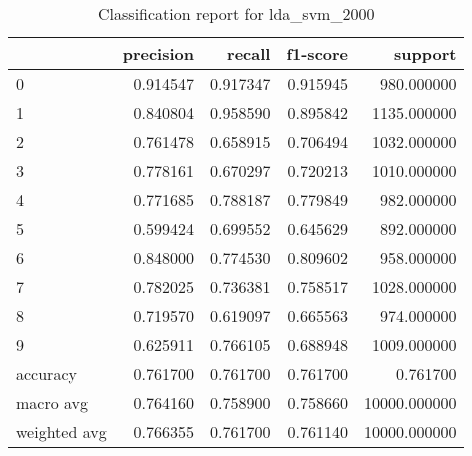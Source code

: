 \begin{table}[htb!]
\centering
\caption{Classification report for lda_svm_2000}
\label{tab:classification-report-lda_svm_2000}
\begin{tabular}{lrrrr}
\toprule
 & precision & recall & f1-score & support \\
\midrule
0 & 0.914547 & 0.917347 & 0.915945 & 980.000000 \\
1 & 0.840804 & 0.958590 & 0.895842 & 1135.000000 \\
2 & 0.761478 & 0.658915 & 0.706494 & 1032.000000 \\
3 & 0.778161 & 0.670297 & 0.720213 & 1010.000000 \\
4 & 0.771685 & 0.788187 & 0.779849 & 982.000000 \\
5 & 0.599424 & 0.699552 & 0.645629 & 892.000000 \\
6 & 0.848000 & 0.774530 & 0.809602 & 958.000000 \\
7 & 0.782025 & 0.736381 & 0.758517 & 1028.000000 \\
8 & 0.719570 & 0.619097 & 0.665563 & 974.000000 \\
9 & 0.625911 & 0.766105 & 0.688948 & 1009.000000 \\
accuracy & 0.761700 & 0.761700 & 0.761700 & 0.761700 \\
macro avg & 0.764160 & 0.758900 & 0.758660 & 10000.000000 \\
weighted avg & 0.766355 & 0.761700 & 0.761140 & 10000.000000 \\
\bottomrule
\end{tabular}
\end{table}
